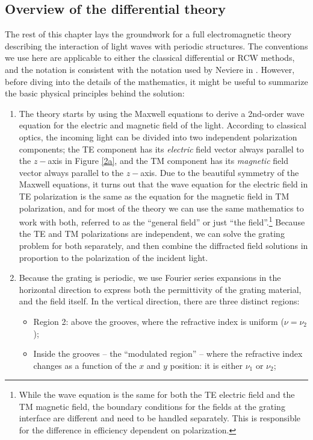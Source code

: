 \subsection{Overview of the differential theory}
\label{overview}
The rest of this chapter lays the groundwork for a full electromagnetic theory describing the interaction of light waves with periodic structures.  The conventions we use here are applicable to either the classical differential or RCW methods, and the notation is consistent with the notation used by Neviere in \cite{Nev02}.  However, before diving into the details of the mathematics, it might be useful to summarize the basic physical principles behind the solution:
  \begin{enumerate}
\item The theory starts by using the Maxwell equations to derive a 2nd-order wave equation for the electric and magnetic field of the light.  According to classical optics, the incoming light can be divided into two independent polarization components; the TE component has its \emph{electric} field vector always parallel to the $z-$axis in Figure \ref{2a}, and the TM component has its \emph{magnetic} field vector always parallel to the $z-$axis.  Due to the beautiful symmetry of the Maxwell equations, it turns out that the wave equation for the electric field in TE polarization is the same as the equation for the magnetic field in TM polarization, and for most of the theory we can use the same mathematics to work with both, referred to as the ``general field'' or just ``the field''.\footnote{While the wave equation is the same for both the TE electric field and the TM magnetic field, the boundary conditions for the fields at the grating interface are different and need to be handled separately.  This is responsible for the difference in efficiency dependent on polarization.}  Because the TE and TM polarizations are independent, we can solve the grating problem for both separately, and then combine the diffracted field solutions in proportion to the polarization of the incident light.
\item Because the grating is periodic, we use Fourier series expansions in the horizontal direction to express both the permittivity of the grating material, and the field itself. In the vertical direction, there are three distinct regions:
	\begin{itemize}
	\item Region 2: above the grooves, where the refractive index is uniform ($\nu = \nu_2$);
	\item Inside the grooves -- the ``modulated region'' -- where the refractive index changes as a function of the $x$ and $y$ position: it is either $\nu_1$ or $\nu_2$;

\end{itemize}
\end{enumerate}
